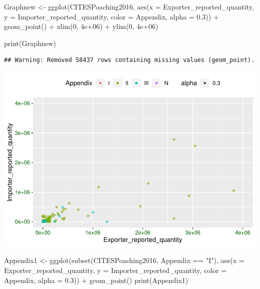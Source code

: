 \documentclass[
  12pt,
]{article}
\newenvironment{Shaded}{\begin{snugshade}}{\end{snugshade}}
\newcommand{\AttributeTok}[1]{\textcolor[rgb]{0.77,0.63,0.00}{#1}}
\newcommand{\DecValTok}[1]{\textcolor[rgb]{0.00,0.00,0.81}{#1}}
\newcommand{\FloatTok}[1]{\textcolor[rgb]{0.00,0.00,0.81}{#1}}
\newcommand{\FunctionTok}[1]{\textcolor[rgb]{0.00,0.00,0.00}{#1}}
\newcommand{\NormalTok}[1]{#1}
\newcommand{\OtherTok}[1]{\textcolor[rgb]{0.56,0.35,0.01}{#1}}
\newcommand{\SpecialCharTok}[1]{\textcolor[rgb]{0.00,0.00,0.00}{#1}}
\newcommand{\StringTok}[1]{\textcolor[rgb]{0.31,0.60,0.02}{#1}}
\begin{document}
\begin{Shaded}
\begin{Highlighting}[]
\NormalTok{Graphnew }\OtherTok{\textless{}{-}} \FunctionTok{ggplot}\NormalTok{(CITESPoaching2016, }\FunctionTok{aes}\NormalTok{(}\AttributeTok{x =}\NormalTok{ Exporter\_reported\_quantity, }\AttributeTok{y =}\NormalTok{ Importer\_reported\_quantity,}
    \AttributeTok{color =}\NormalTok{ Appendix, }\AttributeTok{alpha =} \FloatTok{0.3}\NormalTok{)) }\SpecialCharTok{+} \FunctionTok{geom\_point}\NormalTok{() }\SpecialCharTok{+} \FunctionTok{xlim}\NormalTok{(}\DecValTok{0}\NormalTok{, }\FloatTok{4e+06}\NormalTok{) }\SpecialCharTok{+} \FunctionTok{ylim}\NormalTok{(}\DecValTok{0}\NormalTok{, }\FloatTok{4e+06}\NormalTok{)}

\FunctionTok{print}\NormalTok{(Graphnew)}
\end{Highlighting}
\end{Shaded}

\begin{verbatim}
## Warning: Removed 58437 rows containing missing values (geom_point).
\end{verbatim}

\includegraphics{Wood_ENV872_Project_files/figure-latex/unnamed-chunk-4-3.pdf}

\begin{Shaded}
\begin{Highlighting}[]
\NormalTok{Appendix1 }\OtherTok{\textless{}{-}} \FunctionTok{ggplot}\NormalTok{(}\FunctionTok{subset}\NormalTok{(CITESPoaching2016, Appendix }\SpecialCharTok{==} \StringTok{"I"}\NormalTok{), }\FunctionTok{aes}\NormalTok{(}\AttributeTok{x =}\NormalTok{ Exporter\_reported\_quantity,}
    \AttributeTok{y =}\NormalTok{ Importer\_reported\_quantity, }\AttributeTok{color =}\NormalTok{ Appendix, }\AttributeTok{alpha =} \FloatTok{0.3}\NormalTok{)) }\SpecialCharTok{+} \FunctionTok{geom\_point}\NormalTok{()}
\FunctionTok{print}\NormalTok{(Appendix1)}
\end{Highlighting}
\end{Shaded}
\end{document}
